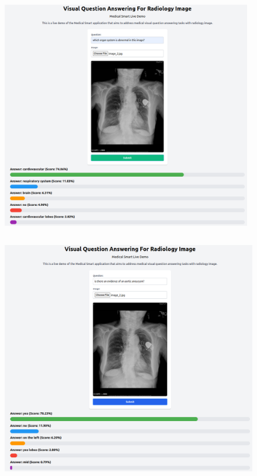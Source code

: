   \begin{figure}[H]
    \centering
    \includegraphics[width=\textwidth, height=10cm]{image/lampiran/radiologi-1.png}
  \end{figure}

  \begin{figure}[H]
    \centering
    \includegraphics[width=\textwidth, height=11cm]{image/lampiran/radiologi-2.png}
  \end{figure}

